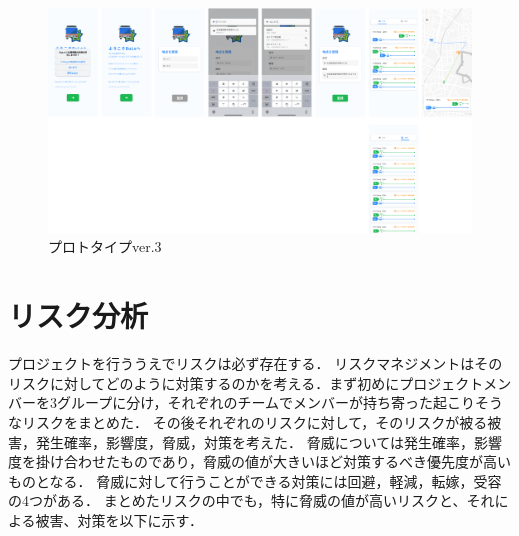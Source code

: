 \begin{figure}[H]
    \centering
    \includegraphics[width=12cm]{images/prototype_v4.png}
    \caption{プロトタイプver.3}
    \label{fig:prototype_v3}
\end{figure}

\section{リスク分析}
プロジェクトを行ううえでリスクは必ず存在する．
リスクマネジメント\cite{risk}はそのリスクに対してどのように対策するのかを考える．まず初めにプロジェクトメンバーを3グループに分け，それぞれのチームでメンバーが持ち寄った起こりそうなリスクをまとめた．
その後それぞれのリスクに対して，そのリスクが被る被害，発生確率，影響度，脅威，対策を考えた．
脅威については発生確率，影響度を掛け合わせたものであり，脅威の値が大きいほど対策するべき優先度が高いものとなる．
脅威に対して行うことができる対策には回避，軽減，転嫁，受容の4つがある．
まとめたリスクの中でも，特に脅威の値が高いリスクと、それによる被害、対策を以下に示す．

